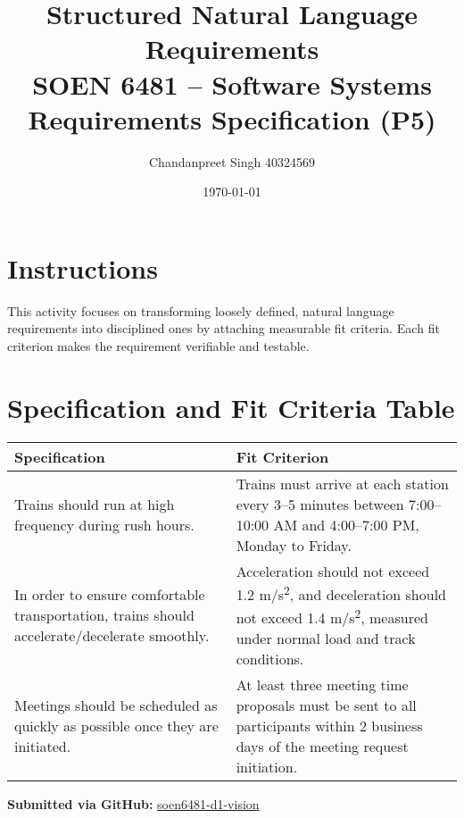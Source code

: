 \documentclass[12pt]{article}
\title{Structured Natural Language Requirements\\
\large SOEN 6481 – Software Systems Requirements Specification (P5)}
\author{Chandanpreet Singh 40324569}
\date{\today}
\begin{document}
\maketitle

\section*{Instructions}
This activity focuses on transforming loosely defined, natural language requirements into disciplined ones by attaching measurable fit criteria. Each fit criterion makes the requirement verifiable and testable.

\section*{Specification and Fit Criteria Table}

\begin{tabular}{p{} p{}}
\toprule
\textbf{Specification} & \textbf{Fit Criterion} \\
\midrule

Trains should run at high frequency during rush hours. 
&
Trains must arrive at each station every 3–5 minutes between 7:00–10:00 AM and 4:00–7:00 PM, Monday to Friday. \\
\addlinespace

In order to ensure comfortable transportation, trains should accelerate/decelerate smoothly. 
&
Acceleration should not exceed 1.2 m/s\textsuperscript{2}, and deceleration should not exceed 1.4 m/s\textsuperscript{2}, measured under normal load and track conditions. \\
\addlinespace

Meetings should be scheduled as quickly as possible once they are initiated. 
&
At least three meeting time proposals must be sent to all participants within 2 business days of the meeting request initiation. \\
\bottomrule
\end{tabular}

\vspace{1cm}
\noindent\textbf{Submitted via GitHub:} \href{https://github.com/chandanpreet707/soen6481-d1-vision}{soen6481-d1-vision}
\end{document}
